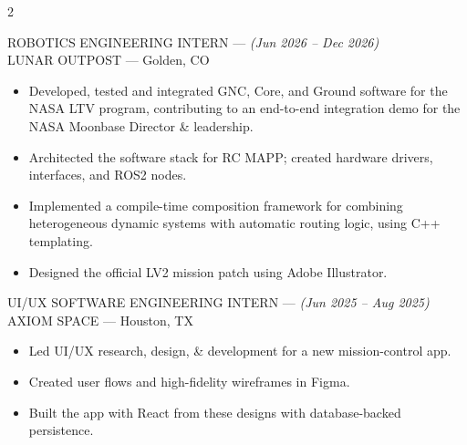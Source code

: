 \documentclass[10pt,letterpaper,ragged2e,withhyper]{altacv}
\newcommand{\experience}[4]{
  \textcolor{subheading}{\MakeUppercase{#1}} \hspace{0.2cm}--- \hspace{0.2cm} \emph{(#2)}\\
  {\MakeUppercase{#3}} \hspace{0.2cm}---\hspace{0.2cm}   #4
  \vspace{4pt}  %
}
\begin{document}
\begin{paracol}{2}
\begin{leftcolumn}
%


\end{leftcolumn}

\switchcolumn


\experience
  {Robotics Engineering Intern}
  {Jun 2026 – Dec 2026}
  {Lunar Outpost}
  {Golden, CO}
\begin{itemize}
  \item Developed, tested and integrated GNC, Core, and Ground software for the NASA LTV program, contributing to an end-to-end integration demo for the NASA Moonbase Director \& leadership.
  \item Architected the software stack for RC MAPP; created hardware drivers, interfaces, and ROS2 nodes.
  \item Implemented a compile-time composition framework for combining heterogeneous dynamic systems with automatic routing logic, using C++ templating. 
  \item Designed the official LV2 mission patch using Adobe Illustrator.
\end{itemize}

\divider

\experience
  {UI/UX Software Engineering Intern}
  {Jun 2025 – Aug 2025}
  {Axiom Space}
  {Houston, TX}
\begin{itemize}
  \item Led UI/UX research, design, \& development for a new mission-control app.
  \item Created user flows and high-fidelity wireframes in Figma.
  \item Built the app with React from these designs with database-backed persistence.
\end{itemize}


\end{paracol}
\end{document}
